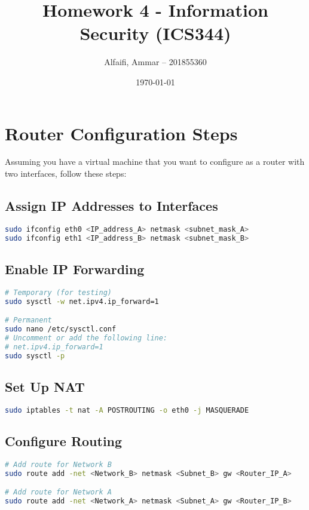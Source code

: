 \documentclass{article}
\title{Homework 4 - Information Security (ICS344)}
\author{Alfaifi, Ammar -- 201855360}
\date{\today}
\begin{document}
\maketitle

\section{Router Configuration Steps}

Assuming you have a virtual machine that you want to configure as a router with two interfaces, follow these steps:

\subsection{Assign IP Addresses to Interfaces}

\begin{lstlisting}[language=bash, caption={Assign IP addresses to interfaces}]
sudo ifconfig eth0 <IP_address_A> netmask <subnet_mask_A>
sudo ifconfig eth1 <IP_address_B> netmask <subnet_mask_B>
\end{lstlisting}

\subsection{Enable IP Forwarding}

\begin{lstlisting}[language=bash, caption={Enable IP forwarding}]
# Temporary (for testing)
sudo sysctl -w net.ipv4.ip_forward=1

# Permanent
sudo nano /etc/sysctl.conf
# Uncomment or add the following line:
# net.ipv4.ip_forward=1
sudo sysctl -p
\end{lstlisting}

\subsection{Set Up NAT}

\begin{lstlisting}[language=bash, caption={Set up NAT}]
sudo iptables -t nat -A POSTROUTING -o eth0 -j MASQUERADE
\end{lstlisting}

\subsection{Configure Routing}

\begin{lstlisting}[language=bash, caption={Configure static routes}]
# Add route for Network B
sudo route add -net <Network_B> netmask <Subnet_B> gw <Router_IP_A>

# Add route for Network A
sudo route add -net <Network_A> netmask <Subnet_A> gw <Router_IP_B>
\end{lstlisting}
\end{document}
